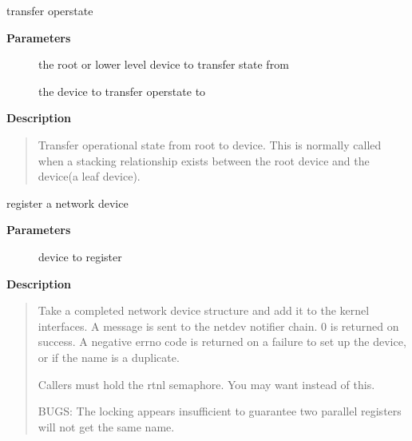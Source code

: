 \documentclass[a4paper,8pt,english]{sphinxmanual}
\begin{document}
\begin{fulllineitems}
\label{networking/kapi:c.netif_stacked_transfer_operstate}
transfer operstate

\end{fulllineitems}


\textbf{Parameters}
\begin{description}
\item[{}] \leavevmode
the root or lower level device to transfer state from

\item[{}] \leavevmode
the device to transfer operstate to

\end{description}

\textbf{Description}
\begin{quote}

Transfer operational state from root to device. This is normally
called when a stacking relationship exists between the root
device and the device(a leaf device).
\end{quote}

\begin{fulllineitems}
\label{networking/kapi:c.register_netdevice}
register a network device

\end{fulllineitems}


\textbf{Parameters}
\begin{description}
\item[{}] \leavevmode
device to register

\end{description}

\textbf{Description}
\begin{quote}

Take a completed network device structure and add it to the kernel
interfaces. A  message is sent to the netdev notifier
chain. 0 is returned on success. A negative errno code is returned
on a failure to set up the device, or if the name is a duplicate.

Callers must hold the rtnl semaphore. You may want
{\hyperref[networking/kapi:c.register_netdev]{\emph{}}} instead of this.

BUGS:
The locking appears insufficient to guarantee two parallel registers
will not get the same name.
\end{quote}
\end{document}
